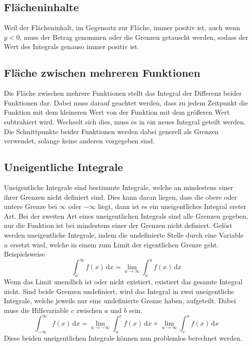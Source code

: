 \documentclass{article}
\begin{document}
\subsection{Flächeninhalte}
Weil der Flächeninhalt, im Gegensatz zur Fläche, immer positiv ist, auch wenn $y<0$, muss der Betrag genommen oder die Grenzen getauscht werden, sodass der Wert des Integrals genauso immer positiv ist. 
 
\subsection{Fläche zwischen mehreren Funktionen}
Die Fläche zwischen mehrere Funktionen stellt das Integral der Differenz beider Funktionen dar. Dabei muss darauf geachtet werden, dass zu jedem Zeitpunkt die Funktion mit dem kleineren Wert von der Funktion mit dem größeren Wert subtrahiert wird. Wechselt sich dies, muss es in ein neues Integral geteilt werden. Die Schnittpunkte beider Funktionen werden dabei generell als Grenzen verwendet, solange keine anderen vorgegeben sind. 
 
\subsection{Uneigentliche Integrale}
Uneigentliche Integrale sind bestimmte Integrale, welche an mindestens einer ihrer Grenzen nicht definiert sind. Dies kann daran liegen, dass die obere oder untere Grenze bei $\infty$ oder $-\infty$ liegt, dann ist es ein uneigentliches Integral erster Art. Bei der zweiten Art eines uneigentlichen Integrals sind alle Grenzen gegeben, nur die Funktion ist bei mindestens einer der Grenzen nicht definiert. \newline
Gelöst werden uneigentliche Integrale, indem die undefinierte Stelle durch eine Variable $u$ ersetzt wird, welche in einem zum Limit der eigentlichen Grenze geht. Beispielsweise
\[
 \int_a^\infty f(x)\,\mathrm{d}x =
 \lim_{u \to \infty} \int_a^u f(x)\,\mathrm{d}x
\]
Wenn das Limit unendlich ist oder nicht existiert, existiert das gesamte Integral nicht. \newline 
Sind beide Grenzen undefiniert, wird das Integral in zwei uneigentliche Integrale, welche jeweils nur eine undefinierte Grenze haben, aufgeteilt. Dabei muss die Hilfsvariable $c$ zwischen $a$ und $b$ sein.
\[
 \int_{-\infty}^\infty f(x)\,\mathrm{d}x =
 \lim_{u \to -\infty} \int_u^c f(x)\,\mathrm{d}x + 
 \lim_{u \to \infty} \int_c^u f(x)\,\mathrm{d}x
\]
Diese beiden uneigentlichen Integrale können nun problemlos berechnet werden.  
 
\end{document}
